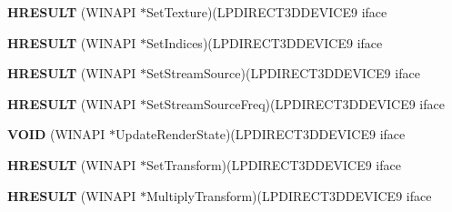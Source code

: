 \begin{DoxyCompactItemize}
\item 
\mbox{\label{struct___i_direct3_d_device9_vtbl___i_n_t_a85ccf58aec4c1553c81cf9056ec53d65}} 
{\bfseries H\+R\+E\+S\+U\+LT} (W\+I\+N\+A\+PI $\ast$Set\+Texture)(L\+P\+D\+I\+R\+E\+C\+T3\+D\+D\+E\+V\+I\+C\+E9 iface
\item 
\mbox{\label{struct___i_direct3_d_device9_vtbl___i_n_t_acb153abd84e56a87e9b2270427a9c9e1}} 
{\bfseries H\+R\+E\+S\+U\+LT} (W\+I\+N\+A\+PI $\ast$Set\+Indices)(L\+P\+D\+I\+R\+E\+C\+T3\+D\+D\+E\+V\+I\+C\+E9 iface
\item 
\mbox{\label{struct___i_direct3_d_device9_vtbl___i_n_t_ae871932037a42152a9288080d194f544}} 
{\bfseries H\+R\+E\+S\+U\+LT} (W\+I\+N\+A\+PI $\ast$Set\+Stream\+Source)(L\+P\+D\+I\+R\+E\+C\+T3\+D\+D\+E\+V\+I\+C\+E9 iface
\item 
\mbox{\label{struct___i_direct3_d_device9_vtbl___i_n_t_ad496f95b5af7435eab4c9f10f7d8f936}} 
{\bfseries H\+R\+E\+S\+U\+LT} (W\+I\+N\+A\+PI $\ast$Set\+Stream\+Source\+Freq)(L\+P\+D\+I\+R\+E\+C\+T3\+D\+D\+E\+V\+I\+C\+E9 iface
\item 
\mbox{\label{struct___i_direct3_d_device9_vtbl___i_n_t_a51185c25d5b669e939bd0aa85729bb60}} 
{\bfseries V\+O\+ID} (W\+I\+N\+A\+PI $\ast$Update\+Render\+State)(L\+P\+D\+I\+R\+E\+C\+T3\+D\+D\+E\+V\+I\+C\+E9 iface
\item 
\mbox{\label{struct___i_direct3_d_device9_vtbl___i_n_t_a4c25456b059c40e4bad7856eabff82f8}} 
{\bfseries H\+R\+E\+S\+U\+LT} (W\+I\+N\+A\+PI $\ast$Set\+Transform)(L\+P\+D\+I\+R\+E\+C\+T3\+D\+D\+E\+V\+I\+C\+E9 iface
\item 
\mbox{\label{struct___i_direct3_d_device9_vtbl___i_n_t_af55373e8a2ec18837d33a77cccd5508a}} 
{\bfseries H\+R\+E\+S\+U\+LT} (W\+I\+N\+A\+PI $\ast$Multiply\+Transform)(L\+P\+D\+I\+R\+E\+C\+T3\+D\+D\+E\+V\+I\+C\+E9 iface
\item 
\mbox{\label{struct___i_direct3_d_device9_vtbl___i_n_t_abc33949cafc9aa4202f08889669f5f58}} 

\end{DoxyCompactItemize}
